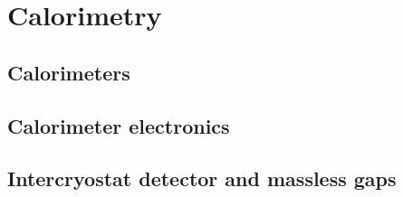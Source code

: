 
\section{Calorimetry}
\subsection{Calorimeters}
\subsection{Calorimeter electronics}
\subsection{Intercryostat detector and massless gaps}
